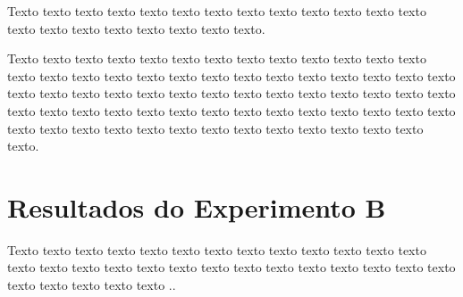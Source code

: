 \begin{figure}[h!]
	\centering
\end{figure}



Texto texto texto texto texto texto texto texto texto texto texto texto texto texto texto texto texto texto texto texto texto.

Texto texto texto texto texto texto texto texto texto texto texto texto texto texto texto texto texto texto texto texto texto texto texto texto texto texto texto texto texto texto texto texto texto texto texto texto texto texto texto texto texto texto texto texto texto texto texto texto texto texto texto texto texto texto texto texto texto texto texto texto texto texto texto texto texto texto texto texto texto.

\section{Resultados do Experimento B}
\label{sec:resultados-do-experimento-b}


Texto texto texto texto texto texto texto texto texto texto texto texto texto texto texto texto texto texto texto texto texto texto texto texto texto texto texto texto texto texto texto texto ..

\begin{table}[h!]	
	\centering
\end{table}


